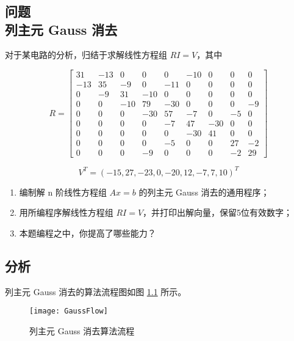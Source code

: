 \chapter[第三章]{} %
\label{cha:chapter3}

\section{问题 \\ 列主元 Gauss 消去}

对于某电路的分析，归结于求解线性方程组 $RI = V$，其中

$$
R = 
\begin{bmatrix}
31 & -13 & 0 & 0 & 0 & -10 & 0 & 0 & 0 \\
-13 & 35 & -9 & 0 & -11 & 0 & 0 & 0 & 0 \\
0 & -9 & 31 & -10 & 0 & 0 & 0 & 0 & 0 \\
0 & 0 & -10 & 79 & -30 & 0 & 0 & 0 & -9 \\
0 & 0 & 0 & -30 & 57 & -7 & 0 & -5 & 0 \\
0 & 0 & 0 & 0 & -7 & 47 & -30 & 0 & 0 \\
0 & 0 & 0 & 0 & 0 & -30 & 41 & 0 & 0 \\
0 & 0 & 0 & 0 & -5 & 0 & 0 & 27 & -2 \\
0 & 0 & 0 & -9 & 0 & 0 & 0 & -2 & 29
\end{bmatrix}
$$

$$
V^T = (-15, 27, -23, 0, -20, 12, -7, 7, 10)^T
$$

\begin{enumerate}
    \item 编制解 n 阶线性方程组 $Ax = b$ 的列主元 Gauss 消去的通用程序；

    \item 用所编程序解线性方程组 $RI = V$，并打印出解向量，保留5位有效数字；

    \item 本题编程之中，你提高了哪些能力？

\end{enumerate}

\section{分析}

列主元 Gauss 消去的算法流程图如图 \ref{fig:GaussFlow} 所示。

  \begin{figure}[H]
  \centering
    \texttt{[image: GaussFlow]}
    \caption{列主元 Gauss 消去算法流程}
    \label{fig:GaussFlow}
  \end{figure}


